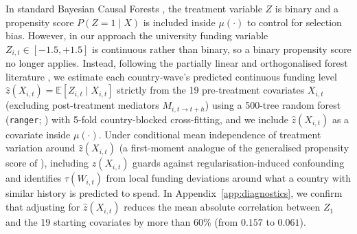 \documentclass[11pt,a4paper]{article}
\begin{document}
In standard Bayesian Causal Forests \citep{hahn2020bayesian}, the treatment variable $Z$ is binary and a propensity score $P(Z = 1 \mid X)$ is included inside $\mu(\cdot)$ to control for selection bias. However, in our approach the university funding variable $Z_{i,t} \in [-1.5, +1.5]$ is continuous rather than binary, so a binary propensity score no longer applies. Instead, following the partially linear and orthogonalised forest literature \citep{robinson1988root, chernozhukov2018double, athey2019generalized}, we estimate each country-wave's predicted continuous funding level $\hat{z}(X_{i,t}) = \mathbb{E}[Z_{i,t} \mid X_{i,t}]$ strictly from the 19 pre-treatment covariates $X_{i,t}$ (excluding post-treatment mediators $M_{i,t\to t+h}$) using a 500-tree random forest (\texttt{ranger}; \citealt{breiman2001random, wright2017ranger}) with 5-fold country-blocked cross-fitting, and we include $\hat{z}(X_{i,t})$ as a covariate inside $\mu(\cdot)$. Under conditional mean independence of treatment variation around $\hat{z}(X_{i,t})$ (a first-moment analogue of the generalised propensity score of \citealt{hirano2004propensity}), including $\hat{z}(X_{i,t})$ guards against regularisation-induced confounding \citep{hahn2020bayesian} and identifies $\tau(W_{i,t})$ from local funding deviations around what a country with similar history is predicted to spend. In Appendix~\ref{app:diagnostics}, we confirm that adjusting for $\hat{z}(X_{i,t})$ reduces the mean absolute correlation between $Z_1$ and the 19 starting covariates by more than 60\% (from $0.157$ to $0.061$).
\end{document}
